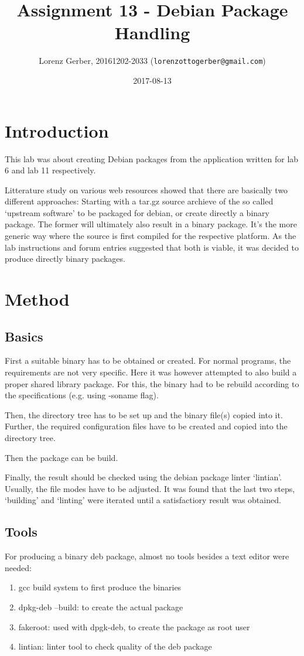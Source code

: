 \documentclass[a4paper,11pt,twoside]{article}
\title{Assignment 13 - Debian Package Handling}
\author{Lorenz Gerber, 20161202-2033 ({\tt{lorenzottogerber@gmail.com}})}
\date{2017-08-13}
\begin{document}
\lstset{language=C}
\maketitle
\thispagestyle{empty}
\newpage

\clearpage
{}

\section{Introduction}
This lab was about creating Debian packages from the application written for
lab 6 and lab 11 respectively.

Litterature study on various web resources showed that there are basically two
different approaches: Starting with a tar.gz source archieve of the so called
`upstream software' to be packaged for debian, or create directly a binary
package. The former will ultimately also result in a binary package. It's the
more generic way where the source is first compiled for the respective platform.
As the lab instructions and forum entries suggested that both is viable, it was
decided to produce directly binary packages.

\section{Method}
\subsection{Basics}
First a suitable binary has to be obtained or created. For normal programs, the
requirements are not very specific. Here it was however attempted to also build
a proper shared library package. For this, the binary had to be rebuild according
to the specifications (e.g. using -soname flag)\cite{debShlibs}.

Then, the directory tree has to be set up and the binary file(s) copied into it.
Further, the required configuration files have to be created and copied into the
directory tree.

Then the package can be build.

Finally, the result should be checked using the debian package linter `lintian'.
Usually, the file modes have to be adjusted. It was found that the last two steps,
`building' and `linting' were iterated until a satisfactiory result was obtained.

\subsection{Tools}
For producing a binary deb package, almost no tools besides a text editor were
needed:
\begin{enumerate}
\item gcc build system to first produce the binaries
\item dpkg-deb --build: to create the actual package
\item fakeroot: used with dpgk-deb, to create the package as root user
\item lintian: linter tool to check quality of the deb package
\end{enumerate}
\end{document}
